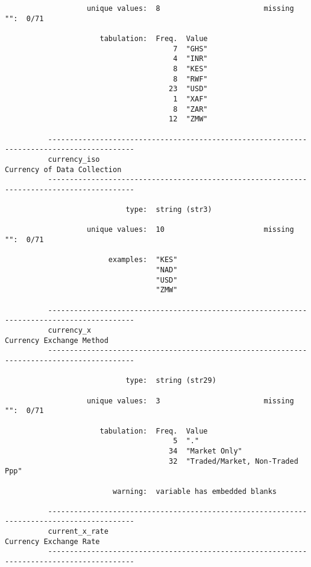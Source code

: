\documentclass{article}
\begin{document}
\begin{verbatim}
                   unique values:  8                        missing "":  0/71
          
                      tabulation:  Freq.  Value
                                       7  "GHS"
                                       4  "INR"
                                       8  "KES"
                                       8  "RWF"
                                      23  "USD"
                                       1  "XAF"
                                       8  "ZAR"
                                      12  "ZMW"
          
          ------------------------------------------------------------------------------------------
          currency_iso                                                   Currency of Data Collection
          ------------------------------------------------------------------------------------------
          
                            type:  string (str3)
          
                   unique values:  10                       missing "":  0/71
          
                        examples:  "KES"
                                   "NAD"
                                   "USD"
                                   "ZMW"
          
          ------------------------------------------------------------------------------------------
          currency_x                                                        Currency Exchange Method
          ------------------------------------------------------------------------------------------
          
                            type:  string (str29)
          
                   unique values:  3                        missing "":  0/71
          
                      tabulation:  Freq.  Value
                                       5  "."
                                      34  "Market Only"
                                      32  "Traded/Market, Non-Traded Ppp"
          
                         warning:  variable has embedded blanks
          
          ------------------------------------------------------------------------------------------
          current_x_rate                                                      Currency Exchange Rate
          ------------------------------------------------------------------------------------------
          

\end{verbatim}
\end{document}
